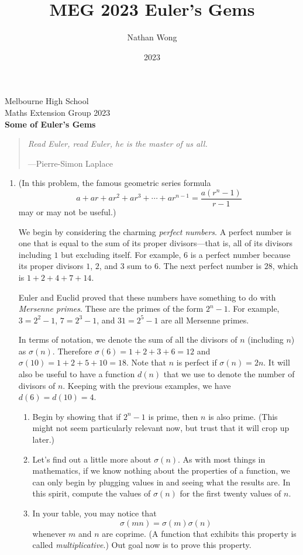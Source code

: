 \documentclass[a4paper,10pt]{article}
\title{MEG 2023 Euler's Gems}
\author{Nathan Wong}
\date{2023}
\newcommand{\thetitle}{Some of Euler's Gems}
\begin{document}
\noindent Melbourne High School\\
Maths Extension Group 2023\\
\textbf{\thetitle}\\

\begin{quote}
  \emph{Read Euler, read Euler, he is the master of us all.}
\begin{flushright}---Pierre-Simon Laplace\end{flushright}
\end{quote}

\begin{enumerate}
\item (In this problem, the famous geometric series formula
    \[ a+ar+ar^2+ar^3+\cdots+ar^{n-1}=\frac{a(r^n-1)}{r-1}\] may or may not be useful.)

  We begin by considering the charming \emph{perfect numbers}. A perfect number
  is one that is equal to the sum of its proper divisors---that is, all of its divisors including
  \(1\) but excluding itself. For example, \(6\) is a perfect number because its proper divisors
  \(1\), \(2\), and \(3\) sum to \(6\). The next perfect number is \(28\), which is \(1+2+4+7+14.\)

  Euler and Euclid proved that these numbers have something to do with \emph{Mersenne primes}. These
  are the primes of the form \(2^n-1\). For example, \(3=2^2-1\), \(7=2^3-1\), and \(31=2^5-1\) are all
  Mersenne primes.

  In terms of notation, we denote the sum of all the divisors of \(n\) (including \(n\)) as \(\sigma(n)\).
  Therefore \(\sigma(6)=1+2+3+6=12\) and \(\sigma(10)=1+2+5+10=18\). Note that \(n\) is perfect if \(\sigma(n)=2n\).
  It will also be useful to have a function \(d(n)\) that we use to denote the number of divisors of \(n\). Keeping
  with the previous examples, we have \(d(6)=d(10)=4\).
\begin{enumerate}
\item Begin by showing that if \(2^n-1\) is prime, then \(n\) is also prime. (This might not seem particularly relevant
  now, but trust that it will crop up later.)
\item Let's find out a little more about \(\sigma(n)\). As with most things in mathematics, if we know nothing
  about the properties of a function, we can only begin by plugging values in and seeing what the results are.
  In this spirit, compute the values of \(\sigma(n)\) for the first twenty values of \(n\).
\item In your table, you may notice that \[\sigma(mn)=\sigma(m)\sigma(n)\] whenever \(m\) and \(n\) are coprime.
  (A function that exhibits this property is called \emph{multiplicative}.) Out goal now is to prove this property.


\end{enumerate}
\end{enumerate}
\end{document}
